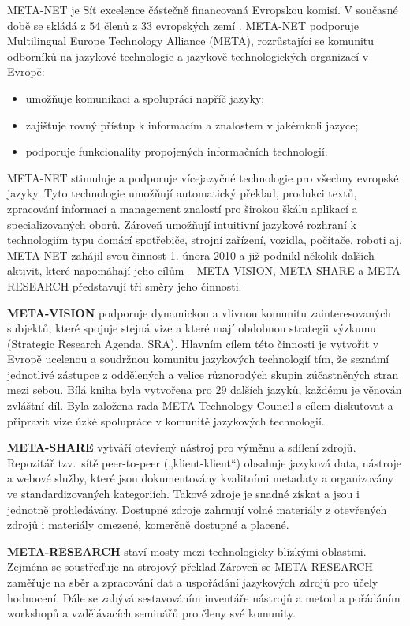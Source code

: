 \begin{multicols}{2}

META-NET je Síť excelence částečně financovaná Evropskou komisí. V současné době se skládá z 54 členů z 33 evropských zemí \cite{rehm2011}. META-NET podporuje Multilingual Europe Technology Alliance (META), rozrůstající se komunitu odborníků na jazykové technologie a jazykově-technologických organizací v Evropě: 

\begin{itemize}
\item umožňuje komunikaci a spolupráci napříč jazyky;
\item zajišťuje rovný přístup k informacím a znalostem v jakémkoli jazyce;
\item podporuje funkcionality propojených informačních technologií.
\end{itemize}

META-NET stimuluje a podporuje vícejazyčné technologie pro všechny evropské jazyky. Tyto technologie umožňují automatický překlad, produkci textů, zpracování informací a management znalostí pro širokou škálu aplikací a specializovaných oborů. Zároveň umožňují intuitivní jazykové rozhraní k technologiím typu domácí spotřebiče, strojní zařízení, vozidla, počítače, roboti aj. META-NET zahájil svou činnost 1. února 2010 a již podnikl několik dalších aktivit, které napomáhají jeho cílům -- META-VISION, META-SHARE a META-RESEARCH představují tři směry jeho činnosti.

\textbf{META-VISION} podporuje dynamickou a vlivnou komunitu zainteresovaných subjektů, které spojuje stejná vize a které mají obdobnou strategii výzkumu (Strategic Research Agenda, SRA). Hlavním cílem této činnosti je vytvořit v Evropě ucelenou a soudržnou komunitu jazykových technologií tím, že seznámí jednotlivé zástupce z oddělených a velice různorodých skupin zúčastněných stran mezi sebou. Bílá kniha byla vytvořena pro 29 dalších jazyků, každému je věnován zvláštní díl. Byla založena rada META Technology Council s cílem diskutovat a připravit vize úzké spolupráce v komunitě jazykových technologií.

\textbf{META-SHARE} vytváří otevřený nástroj pro výměnu a sdílení zdrojů. Repozitář tzv.~sítě peer-to-peer („klient-klient“) obsahuje jazyková data, nástroje a webové služby, které jsou dokumentovány kvalitními metadaty a organizovány ve standardizovaných kategoriích. Takové zdroje je snadné získat a jsou i jednotně prohledávány. Dostupné zdroje zahrnují  volné materiály z otevřených zdrojů i materiály omezené, komerčně dostupné a placené. 

\textbf{META-RESEARCH} staví mosty mezi technologicky blízkými oblastmi. Zejména se soustřeďuje na strojový překlad.Zároveň se META-RESEARCH zaměřuje na sběr a zpracování dat a uspořádání jazykových zdrojů pro účely hodnocení. Dále se zabývá sestavováním inventáře nástrojů a metod a pořádáním workshopů a vzdělávacích seminářů pro členy své komunity. 
\end{multicols}

